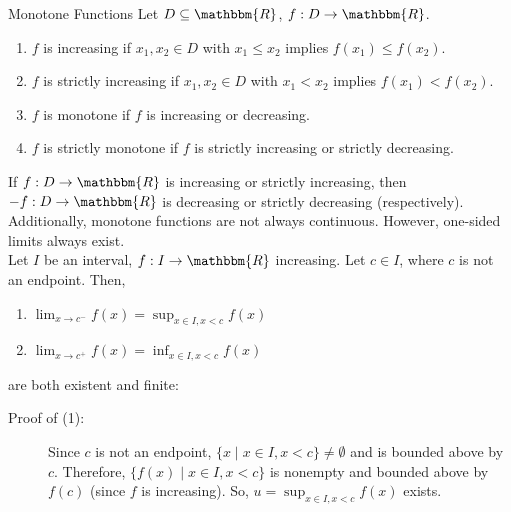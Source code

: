 \documentclass[10pt]{extarticle}
\newcommand{\R}{\mathbbm{R}}
\begin{document}
  \begin{problem}{Monotone Functions}
    Let $D\subseteq \R$, $f: D\rightarrow \R$. 
    \begin{enumerate}[(1)]
      \item $f$ is increasing if $x_1,x_2\in D$ with $x_1\leq x_2$ implies $f(x_1)\leq f(x_2)$.
      \item $f$ is strictly increasing if $x_1,x_2\in D$ with $x_1 < x_2$ implies $f(x_1) < f(x_2)$.
      \item $f$ is monotone if $f$ is increasing or decreasing.
      \item $f$ is strictly monotone if $f$ is strictly increasing or strictly decreasing.
    \end{enumerate}
    If $f: D\rightarrow \R$ is increasing or strictly increasing, then $-f: D\rightarrow \R$ is decreasing or strictly decreasing (respectively).\\

    Additionally, monotone functions are not always continuous. However, one-sided limits always exist.\\

    Let $I$ be an interval, $f: I\rightarrow \R$ increasing. Let $c\in I$, where $c$ is not an endpoint. Then,
    \begin{enumerate}[(1)]
      \item $\lim_{x\rightarrow c^-}f(x) = \sup_{x\in I,x< c}f(x)$
      \item $\lim_{x\rightarrow c^+}f(x) = \inf_{x\in I,x < c}f(x)$
    \end{enumerate}
    are both existent and finite:
    \begin{description}
      \item[Proof of (1):] Since $c$ is not an endpoint, $\{x\mid x\in I,x< c\}\neq \emptyset$ and is bounded above by $c$. Therefore, $\{f(x)\mid x\in I, x < c\}$ is nonempty and bounded above by $f(c)$ (since $f$ is increasing). So, $u = \sup_{x\in I,x < c}f(x)$ exists.\\


\end{description}
\end{problem}
\end{document}
